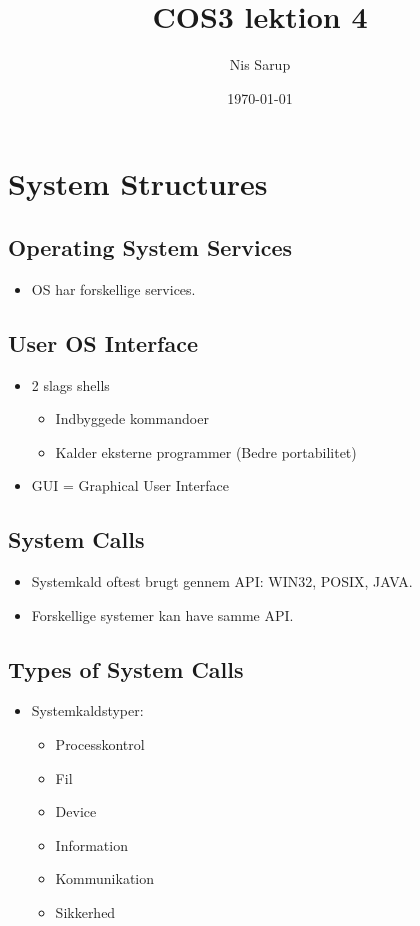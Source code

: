 \documentclass[a4wide,10pt]{article}
\begin{document}
\title{COS3 lektion 4}
\author{Nis Sarup}
\date{\today}
\maketitle


\addtocounter{section}{1}
\section{System Structures} %
\label{sec:kapitel_2}

\subsection{Operating System Services} %
\label{sub:2_1}
\begin{itemize}
	\item  OS har forskellige services.
\end{itemize}

\subsection{User OS Interface} %
\label{sub:2_2}
\begin{itemize}
	\item 2 slags shells
	\begin{itemize}
		\item Indbyggede kommandoer
		\item Kalder eksterne programmer (Bedre portabilitet)
	\end{itemize}
	\item GUI = Graphical User Interface
\end{itemize}

\subsection{System Calls} %
\label{sub:2_3}
\begin{itemize}
	\item Systemkald oftest brugt gennem API: WIN32, POSIX, JAVA.
	\item Forskellige systemer kan have samme API.
\end{itemize}

\subsection{Types of System Calls} %
\label{sub:2_4}
\begin{itemize}
	\item Systemkaldstyper:
	\begin{itemize}
		\item Processkontrol
		\item Fil
		\item Device
		\item Information
		\item Kommunikation
		\item Sikkerhed
	\end{itemize}
\end{itemize}
\end{document}
